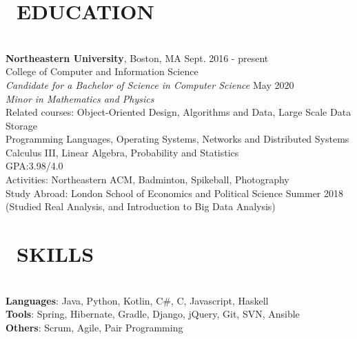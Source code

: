 \documentclass[11pt]{res}
\newcommand{\sectionunderline}{\vspace{-3mm}\hrulefill\\}
\newcommand{\listingtab}{\tabto{3.5cm}}
\newcommand{\newsect}[1]{\section{\Large \bf #1}}
\newcommand{\email}[1]{\faEnvelope\hspace{1mm} \href{mailto:#1}{#1}}
\newcommand{\phone}[1]{\faMobilePhone\hspace{1mm} #1}
\newcommand{\github}[1]{\faGithubAlt\hspace{1mm} \href{https://github.com/#1}{#1}}
\newcommand{\linkedin}[1]{\faLinkedinSquare\hspace{1mm} \href{https://linkedin.com/in/#1}{#1}}
\begin{document}
\address{
  \large\phone{(802) 503-5089}\:
  \large{$\bullet$}
  \large\email{derekpham67@gmail.com}\:
  \large{$\bullet$}
  \large\github{derekpham}\:
  \large{$\bullet$}
  \large\linkedin{derek-pham97}\\
  \normalsize Available: January - August 2019
}

\begin{resume}
  \newsect{\faGraduationCap\ EDUCATION}{
    \sectionunderline{
      {\bf Northeastern University}, Boston, MA \hfill Sept. 2016 - present\\
      College of Computer and Information Science}\\
                     {\it Candidate for a Bachelor of Science in Computer Science} \hfill May 2020\\
                     {\it Minor in Mathematics and Physics}\vspace{2mm}\\
                     Related courses:
                     \listingtab Object-Oriented Design, Algorithms and Data, Large Scale Data Storage\\
                     \listingtab Programming Languages, Operating Systems, Networks and Distributed Systems\\
                     \listingtab Calculus III, Linear Algebra, Probability and Statistics\\
                     GPA:\listingtab 3.98/4.0\\
                     Activities: \listingtab Northeastern ACM, Badminton, Spikeball, Photography\\
                     Study Abroad: \listingtab London School of Economics and Political Science \hfill Summer 2018\\
                     \listingtab (Studied Real Analysis, and Introduction to Big Data Analysis)
  }

  \newsect{\faCogs\ SKILLS}{
    \sectionunderline{
      {\bf Languages}: \listingtab Java, Python, Kotlin, C\#, C, Javascript, Haskell\\
      {\bf Tools}: \listingtab Spring, Hibernate, Gradle, Django, jQuery, Git, SVN, Ansible\\
      {\bf Others}: \listingtab Scrum, Agile, Pair Programming
    }
  }


\end{resume}
\end{document}
